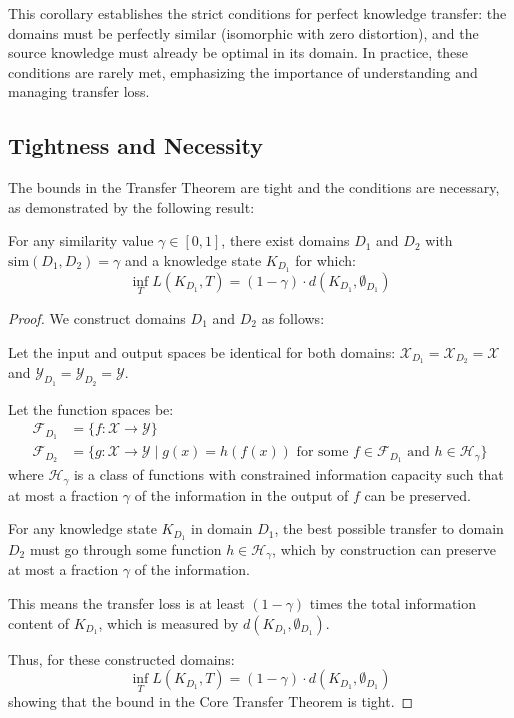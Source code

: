 This corollary establishes the strict conditions for perfect knowledge transfer: the domains must be perfectly similar (isomorphic with zero distortion), and the source knowledge must already be optimal in its domain. In practice, these conditions are rarely met, emphasizing the importance of understanding and managing transfer loss.

\subsection{Tightness and Necessity}

The bounds in the Transfer Theorem are tight and the conditions are necessary, as demonstrated by the following result:

\begin{theorem}
For any similarity value $\gamma \in [0,1]$, there exist domains $D_1$ and $D_2$ with $\text{sim}(D_1, D_2) = \gamma$ and a knowledge state $K_{D_1}$ for which:
\begin{equation}
\inf_{T} L(K_{D_1}, T) = (1 - \gamma) \cdot d(K_{D_1}, \emptyset_{D_1})
\end{equation}
\end{theorem}

\begin{proof}
We construct domains $D_1$ and $D_2$ as follows:

Let the input and output spaces be identical for both domains: $\mathcal{X}_{D_1} = \mathcal{X}_{D_2} = \mathcal{X}$ and $\mathcal{Y}_{D_1} = \mathcal{Y}_{D_2} = \mathcal{Y}$.

Let the function spaces be:
\begin{align}
\mathcal{F}_{D_1} &= \{f: \mathcal{X} \to \mathcal{Y}\} \\
\mathcal{F}_{D_2} &= \{g: \mathcal{X} \to \mathcal{Y} \mid g(x) = h(f(x)) \text{ for some } f \in \mathcal{F}_{D_1} \text{ and } h \in \mathcal{H}_{\gamma}\}
\end{align}
where $\mathcal{H}_{\gamma}$ is a class of functions with constrained information capacity such that at most a fraction $\gamma$ of the information in the output of $f$ can be preserved.

For any knowledge state $K_{D_1}$ in domain $D_1$, the best possible transfer to domain $D_2$ must go through some function $h \in \mathcal{H}_{\gamma}$, which by construction can preserve at most a fraction $\gamma$ of the information.

This means the transfer loss is at least $(1 - \gamma)$ times the total information content of $K_{D_1}$, which is measured by $d(K_{D_1}, \emptyset_{D_1})$.

Thus, for these constructed domains:
\begin{equation}
\inf_{T} L(K_{D_1}, T) = (1 - \gamma) \cdot d(K_{D_1}, \emptyset_{D_1})
\end{equation}
showing that the bound in the Core Transfer Theorem is tight.
\end{proof}

